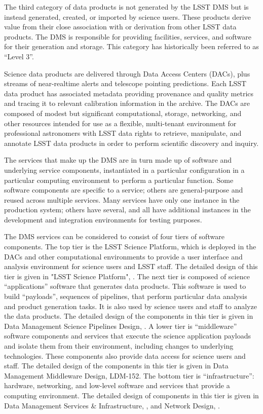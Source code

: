 \documentclass[DM,lsstdraft,toc]{lsstdoc}
\begin{document}
The third category of data products is not generated by the LSST DMS but
is instead generated, created, or imported by science users. These
products derive value from their close association with or derivation
from other LSST data products. The DMS is responsible for providing
facilities, services, and software for their generation and storage.
This category has historically been referred to as ``Level 3''.

Science data products are delivered through Data Access Centers (DACs),
plus streams of near-realtime alerts and telescope pointing predictions.
Each LSST data product has associated metadata providing provenance and
quality metrics and tracing it to relevant calibration information in
the archive. The DACs are composed of modest but significant
computational, storage, networking, and other resources intended for use
as a flexible, multi-tenant environment for professional astronomers
with LSST data rights to retrieve, manipulate, and annotate LSST data
products in order to perform scientific discovery and inquiry.

The services that make up the DMS are in turn made up of software and
underlying service components, instantiated in a particular
configuration in a particular computing environment to perform a
particular function. Some software components are specific to a service;
others are general-purpose and reused across multiple services. Many
services have only one instance in the production system; others have
several, and all have additional instances in the development and
integration environments for testing purposes.

The DMS services can be considered to consist of four tiers of software
components. The top tier is the LSST Science Platform, which is deployed
in the DACs and other computational environments to provide a user
interface and analysis environment for science users and LSST staff. The
detailed design of this tier is given in "LSST Science Platform", . The next
tier is composed of science ``applications'' software that generates
data products. This software is used to build ``payloads'', sequences of
pipelines, that perform particular data analysis and product generation
tasks. It is also used by science users and staff to analyze the data
products. The detailed design of the components in this tier is given in
Data Management Science Pipelines Design, . A lower tier is
``middleware'' software components and services that execute the science
application payloads and isolate them from their environment, including
changes to underlying technologies. These components also provide data
access for science users and staff. The detailed design of the
components in this tier is given in Data Management Middleware Design,
LDM-152. The bottom tier is ``infrastructure'': hardware, networking,
and low-level software and services that provide a computing
environment. The detailed design of components in this tier is given in
Data Management Services \& Infrastructure, , and Network Design,
.
\end{document}
